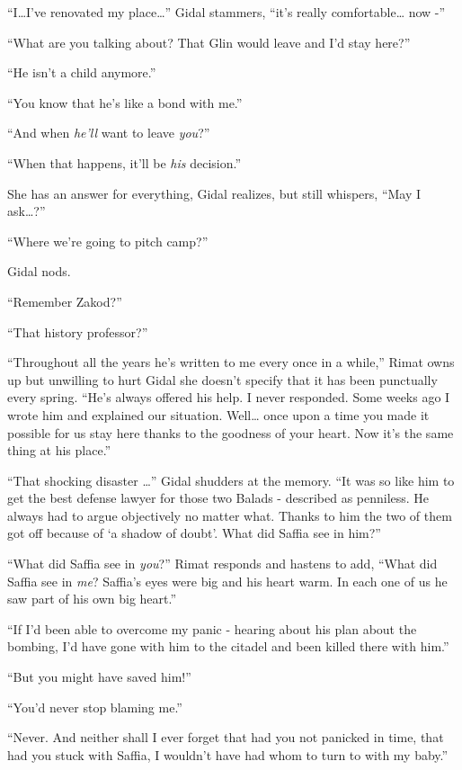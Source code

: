 \documentclass[twoside,11pt]{book}
\begin{document}
``I{\dots}I've renovated my place{\dots}'' Gidal stammers, ``it's really
comfortable{\dots} now -''

``What are you talking about? That Glin would leave and I'd stay here?''

``He isn't a child anymore.''

``You know that he's like a bond with me.''

``And when \textit{he'll} want to leave \textit{you}?''

``When that happens, it'll be \textit{his} decision.''

She has an answer for everything, Gidal realizes, but still whispers, ``May I ask{\dots}?''

``Where we're going to pitch camp?''

Gidal nods.

``Remember Zakod?''

``That history professor?''

``Throughout all the years he's written to me every once in a while,'' Rimat owns up but
unwilling to hurt Gidal she doesn't specify that it has been
punctually every spring. ``He's always offered his help. I never
responded. Some weeks ago I wrote him and explained our situation. Well{\dots} once upon a time you made it possible
for us stay here thanks to the goodness of your heart. Now it's the same thing at his
place.''

``That shocking disaster {\dots}'' Gidal shudders at the
 memory. ``It was so like him to get the best defense lawyer for those two Balads -
described as penniless. He always had to argue objectively no matter what. Thanks to him the two of them got off
because of `a shadow of doubt'. What did Saffia see in him?''

``What did Saffia see in \textit{you}?'' Rimat responds and hastens to add,
``What did Saffia see in \textit{me}? Saffia's eyes were big and his heart warm. In each one of us he saw
part of his own big heart.''

``If I'd been able to overcome my panic - hearing about his plan about the bombing, I'd have gone with him
to the citadel and been killed there with him.''

``But you might have saved him!''

``You'd never stop blaming me.''

``Never. And neither shall I ever forget that had you not panicked in time, that had you
stuck with Saffia, I wouldn't have had whom to turn to with my baby.''
\end{document}
